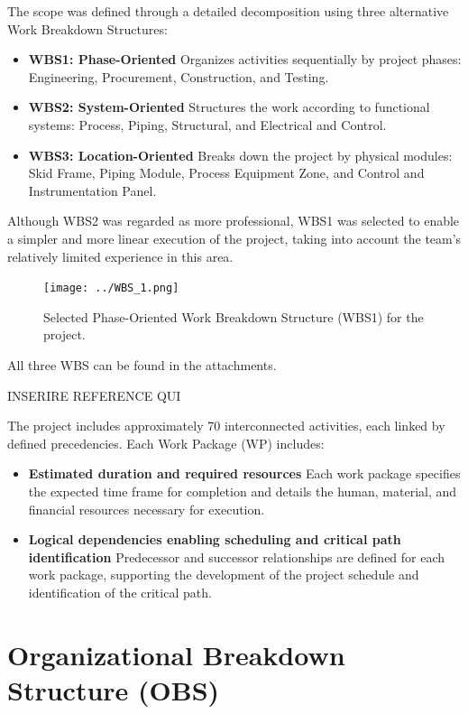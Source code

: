 \documentclass[12pt]{article}
\begin{document}
The scope was defined through a detailed decomposition using three alternative Work Breakdown Structures:
\begin{itemize}
        \item \textbf{WBS1: Phase-Oriented}
              Organizes activities sequentially by project phases: Engineering, Procurement, Construction, and Testing.
        \item \textbf{WBS2: System-Oriented}
              Structures the work according to functional systems: Process, Piping, Structural, and Electrical and Control.
        \item \textbf{WBS3: Location-Oriented}
              Breaks down the project by physical modules: Skid Frame, Piping Module, Process Equipment Zone, and Control and Instrumentation Panel.
\end{itemize}
Although WBS2 was regarded as more professional, WBS1 was selected to enable a simpler and more linear execution of the project, taking into account the team’s relatively limited experience in this area.

\begin{figure}[H]
        \centering
        \texttt{[image: ../WBS\_1.png]}
        \caption{Selected Phase-Oriented Work Breakdown Structure (WBS1) for the project.}
        \label{fig:wbs1}
\end{figure}
All three WBS can be found in the attachments.

INSERIRE REFERENCE QUI

The project includes approximately 70 interconnected activities, each linked by defined precedencies.
Each Work Package (WP) includes:
\begin{itemize}
        \item \textbf{Estimated duration and required resources}
              Each work package specifies the expected time frame for completion and details the human, material, and financial resources necessary for execution.
        \item \textbf{Logical dependencies enabling scheduling and critical path identification}
              Predecessor and successor relationships are defined for each work package, supporting the development of the project schedule and identification of the critical path.
\end{itemize}

\section{Organizational Breakdown Structure (OBS)}
\end{document}
